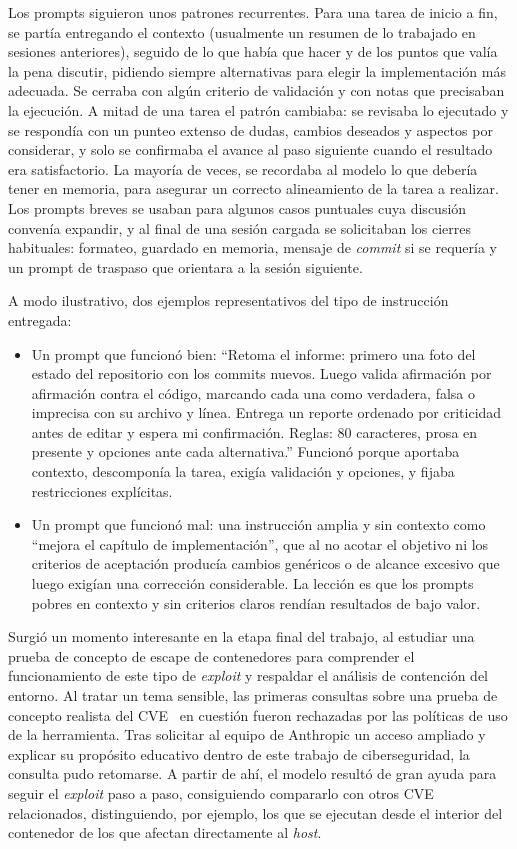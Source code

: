Los prompts siguieron unos patrones recurrentes. Para una tarea de inicio a fin,
se partía entregando el contexto (usualmente un resumen de lo trabajado en
sesiones anteriores), seguido de lo que había que hacer y de los puntos que
valía la pena discutir, pidiendo siempre alternativas para elegir la
implementación más adecuada. Se cerraba con algún criterio de validación y con
notas que precisaban la ejecución. A mitad de una tarea el patrón cambiaba: se
revisaba lo ejecutado y se respondía con un punteo extenso de dudas, cambios
deseados y aspectos por considerar, y solo se confirmaba el avance al paso
siguiente cuando el resultado era satisfactorio. La mayoría de veces, se
recordaba al modelo lo que debería tener en memoria, para asegurar un correcto
alineamiento de la tarea a realizar. Los prompts breves se usaban para algunos
casos puntuales cuya discusión convenía expandir, y al final de una sesión
cargada se solicitaban los cierres habituales: formateo, guardado en memoria,
mensaje de \textit{commit} si se requería y un prompt de traspaso que orientara
a la sesión siguiente.

A modo ilustrativo, dos ejemplos representativos del tipo de instrucción
entregada:

\begin{itemize}
    \item Un prompt que funcionó bien: ``Retoma el informe: primero una foto del
    estado del repositorio con los commits nuevos. Luego valida afirmación por
    afirmación contra el código, marcando cada una como verdadera, falsa o
    imprecisa con su archivo y línea. Entrega un reporte ordenado por criticidad
    antes de editar y espera mi confirmación. Reglas: 80 caracteres, prosa en
    presente y opciones ante cada alternativa.'' Funcionó porque aportaba
    contexto, descomponía la tarea, exigía validación y opciones, y fijaba
    restricciones explícitas.
    \item Un prompt que funcionó mal: una instrucción amplia y sin contexto como
    ``mejora el capítulo de implementación'', que al no acotar el objetivo ni
    los criterios de aceptación producía cambios genéricos o de alcance excesivo
    que luego exigían una corrección considerable. La lección es que los prompts
    pobres en contexto y sin criterios claros rendían resultados de bajo valor.
\end{itemize}

Surgió un momento interesante en la etapa final del trabajo, al estudiar una
prueba de concepto de escape de contenedores para comprender el funcionamiento
de este tipo de \textit{exploit} y respaldar el análisis de contención del
entorno. Al
tratar un tema sensible, las primeras consultas sobre una prueba de concepto
realista del CVE~\cite{cve-runc-2025, poc-cve-2025-31133} en cuestión fueron
rechazadas por las políticas de uso de la herramienta. Tras solicitar al equipo
de Anthropic un acceso ampliado y explicar su propósito educativo dentro de este
trabajo de ciberseguridad, la consulta pudo retomarse. A partir de ahí, el
modelo resultó de gran ayuda para seguir el \textit{exploit} paso a paso,
consiguiendo
compararlo con otros CVE relacionados, distinguiendo, por ejemplo, los que se
ejecutan desde el interior del contenedor de los que afectan directamente al
\textit{host}.

